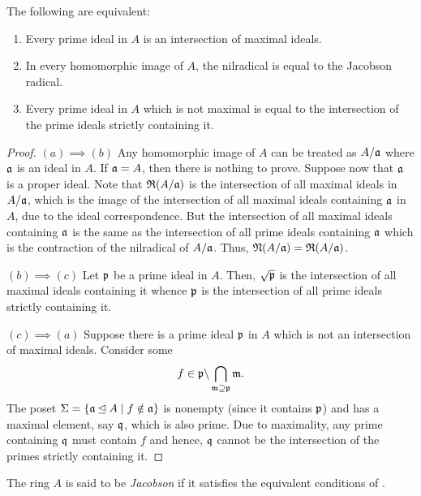 \begin{theorem}
    The following are equivalent: 
    \begin{enumerate}[label=(\alph*)]
        \item Every prime ideal in $A$ is an intersection of maximal ideals. 
        \item In every homomorphic image of $A$, the nilradical is equal to the Jacobson radical. 
        \item Every prime ideal in $A$ which is not maximal is equal to the intersection of the prime ideals strictly containing it.
    \end{enumerate}
\end{theorem}
\begin{proof}
    $(a)\implies(b)$ Any homomorphic image of $A$ can be treated as $A/\mathfrak a$ where $\mathfrak a$ is an ideal in $A$. If $\mathfrak a = A$, then there is nothing to prove. Suppose now that $\mathfrak a$ is a proper ideal. Note that $\mathfrak R(A/\mathfrak a)$ is the intersection of all maximal ideals in $A/\mathfrak a$, which is the image of the intersection of all maximal ideals containing $\mathfrak a$ in $A$, due to the ideal correspondence. But the intersection of all maximal ideals containing $\mathfrak a$ is the same as the intersection of all prime ideals containing $\mathfrak a$ which is the contraction of the nilradical of $A/\mathfrak a$. Thus, $\mathfrak N(A/\mathfrak a) = \mathfrak R(A/\mathfrak a)$.

    $(b)\implies(c)$ Let $\mathfrak p$ be a prime ideal in $A$. Then, $\sqrt{\mathfrak p}$ is the intersection of all maximal ideals containing it whence $\mathfrak p$ is the intersection of all prime ideals strictly containing it.

    $(c)\implies(a)$ Suppose there is a prime ideal $\mathfrak p$ in $A$ which is not an intersection of maximal ideals. Consider some 
    \begin{equation*}
        f\in \mathfrak p\backslash\bigcap_{\mathfrak m\supseteq\mathfrak p}\mathfrak m.
    \end{equation*}
    The poset $\Sigma = \{\mathfrak a\unlhd A\mid f\notin\mathfrak a\}$ is nonempty (since it contains $\mathfrak p$) and has a maximal element, say $\mathfrak q$, which is also prime. Due to maximality, any prime containing $\mathfrak q$ must contain $f$ and hence, $\mathfrak q$ cannot be the intersection of the primes strictly containing it.
\end{proof}

\begin{definition}
    The ring $A$ is said to be \emph{Jacobson} if it satisfies the equivalent conditions of .
\end{definition}